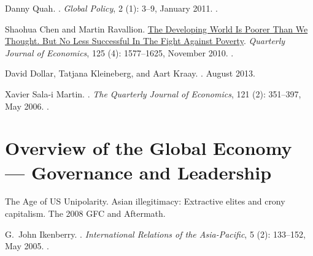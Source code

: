 \documentclass[%
 11pt%
]{article}
\begin{document}
Danny Quah.
.
\newblock \emph{Global Policy}, 2 (1): 3--9, January 2011.
.
\medskip

Shaohua Chen and Martin Ravallion.
\newblock \href{http://qje.oxfordjournals.org/content/125/4/1577.full.pdf}{The Developing World Is Poorer Than We Thought. But No Less
  Successful In The Fight Against Poverty}.
\newblock \emph{Quarterly Journal of Economics}, 125 (4):
  1577--1625, November 2010.
.
\medskip

David Dollar, Tatjana Kleineberg, and Aart Kraay.
.
\newblock August 2013.
\medskip

Xavier Sala-i Martin.
.
\newblock \emph{The Quarterly Journal of Economics}, 121 (2):
  351--397, May 2006.
.
\medskip

\section{Overview of the Global Economy --- Governance and Leadership}

The Age of US Unipolarity.  Asian illegitimacy:  Extractive elites and
crony capitalism.
The 2008 GFC and Aftermath.

\nocite{Ikenberry-GJ-Power+Liberal-Order-2005}
\nocite{Quah-D-Beyond-China+India-2013}
\nocite{Temin-P+Vines-D-The-Leaderless-Economy-2013}
\nocite{Mahbubani-K-Great-Convergence-2013}
\nocite{DeLong-JB+Eichengreen-B-New-Preface-Kindleberger-2012}
\nocite{Cox-M-Power-Shifts-Economic-Change-2012}
\nocite{Rodrik-D-World-BRICS-2013}


\bigskip
G.~John Ikenberry.
.
\newblock \emph{International Relations of the Asia-Pacific}, 5
  (2): 133--152, May 2005.
.
\medskip
\end{document}
